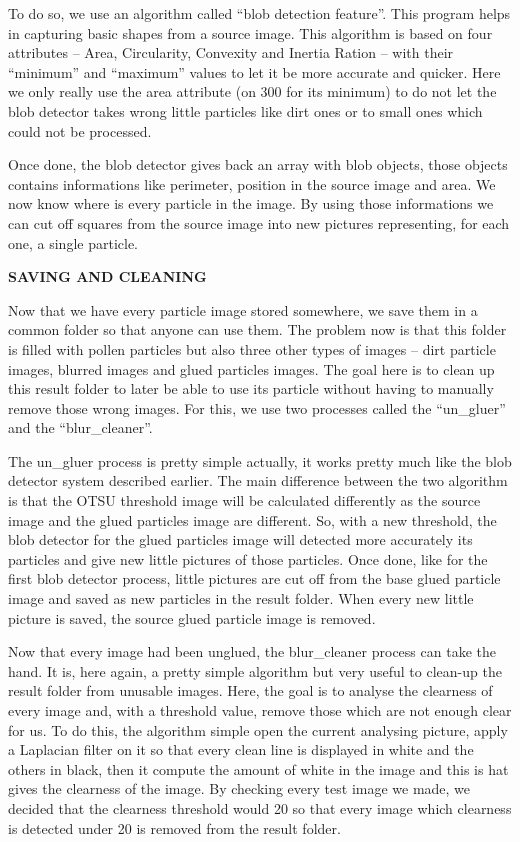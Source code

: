 	To do so, we use an algorithm called “blob detection feature”. This program helps in capturing basic shapes from a source image. This algorithm is based on four attributes – Area, Circularity, Convexity and Inertia Ration – with their “minimum” and “maximum” values to let it be more accurate and quicker. Here we only really use the area attribute (on 300 for its minimum) to do not let the blob detector takes wrong little particles like dirt ones or to small ones which could not be processed.
	
	Once done, the blob detector gives back an array with blob objects, those objects contains informations like perimeter, position in the source image and area. We now know where is every particle in the image. By using those informations we can cut off squares from the source image into new pictures representing, for each one, a single particle.

\textbf{SAVING AND CLEANING}

Now that we have every particle image stored somewhere, we save them in a common folder so that anyone can use them. The problem now is that this folder is filled with pollen particles but also three other types of images – dirt particle images, blurred images and glued particles images. The goal here is to clean up this result folder to later be able to use its particle without having to manually remove those wrong images. For this, we use two processes called the “un\_gluer” and the “blur\_cleaner”.

	The un\_gluer process is pretty simple actually, it works pretty much like the blob detector system described earlier. The main difference between the two algorithm is that the OTSU threshold image will be calculated differently as the source image and the glued particles image are different. So, with a new threshold, the blob detector for the glued particles image will detected more accurately its particles and give new little pictures of those particles. Once done, like for the first blob detector process, little pictures are cut off from the base glued particle image and saved as new particles in the result folder. When every new little picture is saved, the source  glued particle image is removed.
	
	Now that every image had been unglued, the blur\_cleaner process can take the hand. It is, here again, a pretty simple algorithm but very useful to clean-up the result folder from unusable images. Here, the goal is to analyse the clearness of every image and, with a threshold value, remove those which are not enough clear for us. To do this, the algorithm simple open the current analysing picture, apply a Laplacian filter on it so that every clean line is displayed in white and the others in black, then it compute the amount of white in the image and this is hat gives the clearness of the image. By checking every test image we made, we decided that the clearness threshold would 20 so that every image which clearness is detected under 20 is removed from the result folder.
    
    
    
    